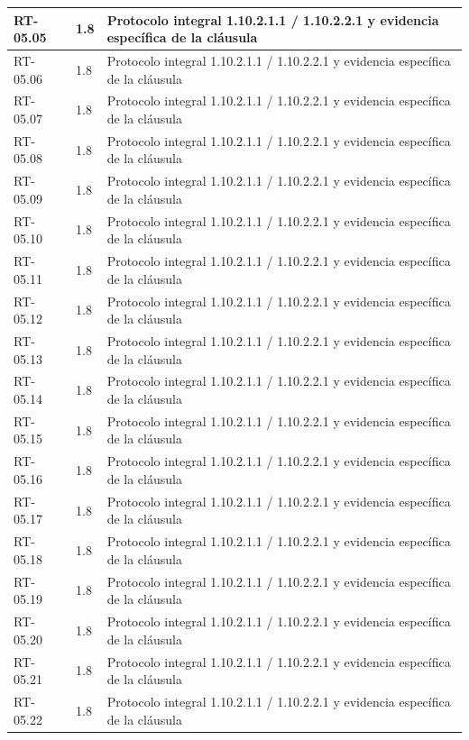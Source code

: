 \begin{longtable}{L{23mm}L{46mm}L{72mm}}
RT-05.05 & 1.8 & Protocolo integral 1.10.2.1.1 / 1.10.2.2.1 y evidencia específica de la cláusula\\\hline
RT-05.06 & 1.8 & Protocolo integral 1.10.2.1.1 / 1.10.2.2.1 y evidencia específica de la cláusula\\\hline
RT-05.07 & 1.8 & Protocolo integral 1.10.2.1.1 / 1.10.2.2.1 y evidencia específica de la cláusula\\\hline
RT-05.08 & 1.8 & Protocolo integral 1.10.2.1.1 / 1.10.2.2.1 y evidencia específica de la cláusula\\\hline
RT-05.09 & 1.8 & Protocolo integral 1.10.2.1.1 / 1.10.2.2.1 y evidencia específica de la cláusula\\\hline
RT-05.10 & 1.8 & Protocolo integral 1.10.2.1.1 / 1.10.2.2.1 y evidencia específica de la cláusula\\\hline
RT-05.11 & 1.8 & Protocolo integral 1.10.2.1.1 / 1.10.2.2.1 y evidencia específica de la cláusula\\\hline
RT-05.12 & 1.8 & Protocolo integral 1.10.2.1.1 / 1.10.2.2.1 y evidencia específica de la cláusula\\\hline
RT-05.13 & 1.8 & Protocolo integral 1.10.2.1.1 / 1.10.2.2.1 y evidencia específica de la cláusula\\\hline
RT-05.14 & 1.8 & Protocolo integral 1.10.2.1.1 / 1.10.2.2.1 y evidencia específica de la cláusula\\\hline
RT-05.15 & 1.8 & Protocolo integral 1.10.2.1.1 / 1.10.2.2.1 y evidencia específica de la cláusula\\\hline
RT-05.16 & 1.8 & Protocolo integral 1.10.2.1.1 / 1.10.2.2.1 y evidencia específica de la cláusula\\\hline
RT-05.17 & 1.8 & Protocolo integral 1.10.2.1.1 / 1.10.2.2.1 y evidencia específica de la cláusula\\\hline
RT-05.18 & 1.8 & Protocolo integral 1.10.2.1.1 / 1.10.2.2.1 y evidencia específica de la cláusula\\\hline
RT-05.19 & 1.8 & Protocolo integral 1.10.2.1.1 / 1.10.2.2.1 y evidencia específica de la cláusula\\\hline
RT-05.20 & 1.8 & Protocolo integral 1.10.2.1.1 / 1.10.2.2.1 y evidencia específica de la cláusula\\\hline
RT-05.21 & 1.8 & Protocolo integral 1.10.2.1.1 / 1.10.2.2.1 y evidencia específica de la cláusula\\\hline
RT-05.22 & 1.8 & Protocolo integral 1.10.2.1.1 / 1.10.2.2.1 y evidencia específica de la cláusula\\\hline

\end{longtable}

